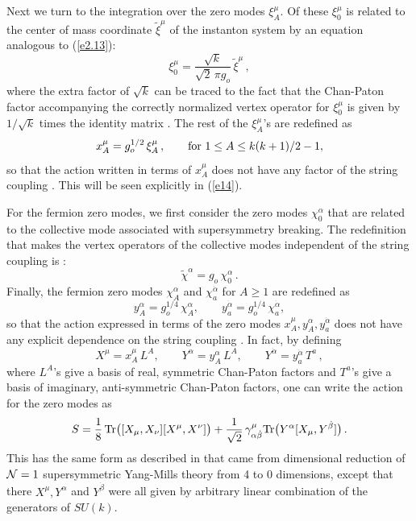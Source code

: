 \documentclass[12pt,a4paper]{article}
\newcommand{\be}{\begin{equation}}
\newcommand{\ee}{\end{equation}}
\newcommand{\refb}[1]{(\ref{#1})}
\def\Tr{{\rm Tr} }
\newcommand{\wt}{\widetilde}
\newcommand{\NN}{{\cal N}}
\newcommand{\dalpha}{\beta}
\def\dalpha{{\dot\alpha}}
\def\dbeta{{\dot\beta}}
\begin{document}
Next we turn to the integration over the zero modes $\xi^\mu_A$. Of these $\xi^\mu_0$
is related to the center of mass coordinate $\wt\xi^\mu$ of the instanton system by an equation
analogous to \refb{e2.13}:
\be
\xi^\mu_0 = \frac{\sqrt k}{\sqrt{2}\, \pi g_o}\, \wt \xi^\mu\, ,
\ee
where the extra factor of $\sqrt k$ can be traced to the fact that the Chan-Paton
factor accompanying the correctly normalized
vertex operator for $\xi_0^\mu$ is given by
$1/\sqrt k$ times the identity matrix \cite{Sen:2021jbr}.
The rest of the $\xi^\mu_A$'s are redefined as
\be
x^\mu_A= g_o^{1/2} \, \xi^\mu_A\, , \qquad \hbox{for $1\le A\le k(k+1)/2-1$},
\ee
so that the action written in terms of $x^\mu_A$ does not have any factor of the
string coupling \cite{Sen:2021jbr,Alexandrov:2021shf}. This will be seen explicitly
in \refb{e14}.

For the fermion zero modes, we first consider the zero modes $\chi_0^\alpha$ that are
related to the collective mode associated with supersymmetry breaking. The redefinition that makes the
vertex operators of the collective modes independent of the string coupling
is \cite{Alexandrov:2021shf}:
\be
\tilde\chi^\alpha = g_o \, \chi^\alpha_0\, .
\ee
Finally, the fermion zero modes $ \chi_A^\alpha$ and $\chi_a^\dalpha$ for $A\ge 1$ are
redefined as
\be \label{e4.7}
y_A^\alpha = g_o^{1/4} \, \chi_A^\alpha, \qquad y_a^\dalpha = g_o^{1/4} \, \chi_a^\dalpha,
\ee
so that the action expressed in terms of the zero modes $x^\mu_A,y_A^\alpha,y_a^\dalpha$
does not have any explicit dependence on the string
coupling \cite{Sen:2021jbr,Alexandrov:2021shf}. In fact, by defining
\be
X^\mu = x^\mu_A \, L^A ,
\qquad
Y^\alpha = y_A^\alpha\, L^A , \qquad Y^\dalpha = y_a^\dalpha\, T^a \, ,
\label{Tvar}
\ee
where $L^A$'s give a basis of real, symmetric Chan-Paton factors and $T^a$'s
give a basis of imaginary, anti-symmetric Chan-Paton factors, one can write the action for the zero modes as
\be \label{e14}
S = {1\over 8}\, \Tr\bigl( [X_\mu, X_\nu] [X^\mu,X^\nu]\bigr) + {1\over \sqrt 2}\, \gamma^\mu_{\alpha\dbeta}
\Tr\bigl(Y^\alpha[X_\mu, Y^\dbeta]\bigr)\, .
\ee
This has the same form as described in \cite{Alexandrov:2021shf} that came from dimensional
reduction of $\NN=1$ supersymmetric Yang-Mills theory from 4 to 0 dimensions,
except that there
$X^\mu,Y^\alpha$ and $Y^\dbeta$ were all given by arbitrary linear combination of the generators of $SU(k)$.
\end{document}
